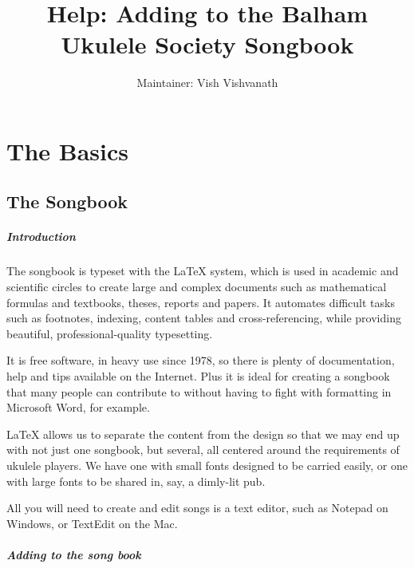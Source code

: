 \documentclass[10pt,a4paper,oneside]{book}
\title{Help: Adding to the Balham Ukulele Society Songbook}
\author{Maintainer: Vish Vishvanath}
\begin{document}
\pagestyle{plain}
\maketitle
\restoregeometry

\dominitoc
\dominilof
\dominilot
\tableofcontents

\setcounter{page}{1}

\chapter{The Basics}\label{ch:the_basics}
\section{The Songbook} %
\label{sec:the_songbook}

\paragraph{Introduction} %
\label{par:introduction}

The songbook is typeset with the LaTeX system, which is used in academic and scientific circles to create large and complex documents such as mathematical formulas and textbooks, theses, reports and papers. It automates difficult tasks such as footnotes, indexing, content tables and cross-referencing, while providing beautiful, professional-quality typesetting.

It is free software, in heavy use since 1978, so there is plenty of documentation, help and tips available on the Internet. Plus it is ideal for creating a songbook that many people can contribute to without having to fight with formatting in Microsoft Word, for example.

LaTeX allows us to separate the content from the design so that we may end up with not just one songbook, but several, all centered around the requirements of ukulele players. We have one with small fonts designed to be carried easily, or one with large fonts to be shared in, say, a dimly-lit pub.

All you will need to create and edit songs is a text editor, such as Notepad on Windows, or TextEdit on the Mac.


\paragraph{Adding to the song book} %
\label{par:adding_to_the_song_book}
\end{document}
